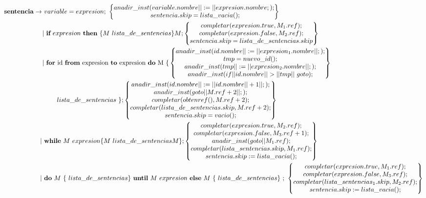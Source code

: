 \documentclass[12pt,a4paper,landscape]{article}
\theoremstyle{mytheor}
\begin{document}
\begin{alignat*}{2}
  \text{\textbf{sentencia}} \to\ & variable = expresion;\ \begin{Bmatrix} anadir\_inst(variable.nombre||:=||expresion.nombre;);\\ sentencia.skip=lista\_vacia();\end{Bmatrix}\\
 |&\ \textbf{if}\ expresion\ \textbf{then}\ \{M\ lista\_de\_sentencias\}M; \begin{Bmatrix} completar(expresion.true,M_1.ref); \\ completar(expresion.false,M_2.ref);\\ sentencia.skip=lista\_de\_sentencias.skip \end{Bmatrix} \\
 |&\text{ \textbf{for} id \textbf{from} expresion \textbf{to} expresion \textbf{do} M \{}\begin{Bmatrix} anadir\_inst(id.nombre||:=||expresion_1.nombre||;);\\ tmp = nuevo\_id();\\ anadir\_inst(tmp||:=||expresion_2.nombre||;);\\ anadir\_inst(if||id.nombre||>||tmp||\ goto);\end{Bmatrix} \\
     &\ \ \ \ \ \ lista\_de\_sentencias\ \}; \begin{Bmatrix} anadir\_inst(id.nombre||:=||id.nombre|| + 1||;);\\ anadir\_inst(goto||M.ref +2||;);\\ completar(obtenref(), M.ref+2);\\completar(lista\_de\_sentencias.skip, M.ref+2);\\  sentencia.skip = vacio();\end{Bmatrix} \\
 |\ &\textbf{while}\ M\ expresion \{M\ lista\_de\_sentencias M\}; \begin{Bmatrix} completar(expresion.true,M_2.ref); \\ completar(expresion.false,M_3.ref+1);\\ anadir\_inst(goto||M_1.ref);\\completar(lista\_sentencias.skip,M_1.ref);\\sentencia.skip:=lista\_vacia(); \end{Bmatrix} \\
 |\ &\textbf{do}\ M\ \{\ lista\_de\_sentencias \}\ \textbf{until}\ M\ expresion\ \textbf{else}\ M\ \{\ lista\_de\_sentencias\}\ ;\ \begin{Bmatrix} completar(expresion.true,M_1.ref); \\ completar(expresion.false,M_3.ref);\\ completar(lista\_sentencias_1.skip,M_2.ref);\\sentencia.skip:=lista\_vacia(); \end{Bmatrix} \\
\end{alignat*}
\end{document}
